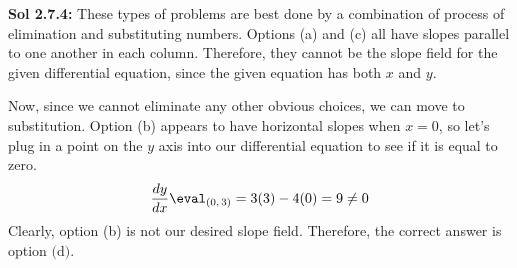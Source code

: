 \begin{tcolorbox}[example]
\begin{oneparchoices}
    \end{oneparchoices}
\end{tcolorbox}
\begin{tcolorbox}[solution]
    \textbf{Sol 2.7.4: } These types of problems are best done by a combination of process of elimination and substituting numbers. Options (a) and (c) all have slopes parallel to one another in each column. Therefore, they cannot be the slope field for the given differential equation, since the given equation has both $x$ and $y$. \par
    \vspace{11pt}
    Now, since we cannot eliminate any other obvious choices, we can move to substitution. Option (b) appears to have horizontal slopes when $x = 0$, so let's plug in a point on the $y$ axis into our differential equation to see if it is equal to zero. \begin{align*}
        \dfrac{dy}{dx} \eval_{(0, \, 3)} = 3(3) - 4(0) = 9 \neq 0
    \end{align*}
    Clearly, option (b) is not our desired slope field. Therefore, the correct answer is option $\boxed{\text{(d)}}$.
\end{tcolorbox} \vspace{11pt}

